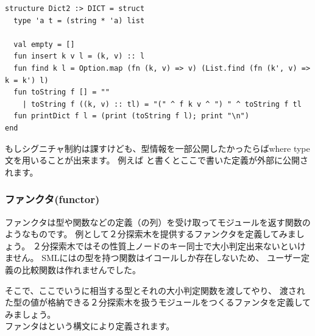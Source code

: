 \documentclass[11pt,a4paper]{jarticle}
\begin{document}
\begin{lstlisting}[caption=リストによる辞書の実装,label=code:list-dict]
structure Dict2 :> DICT = struct
  type 'a t = (string * 'a) list

  val empty = []
  fun insert k v l = (k, v) :: l
  fun find k l = Option.map (fn (k, v) => v) (List.find (fn (k', v) => k = k') l)
  fun toString f [] = ""
    | toString f ((k, v) :: tl) = "(" ^ f k v ^ ") " ^ toString f tl
  fun printDict f l = (print (toString f l); print "\n")
end
\end{lstlisting}

もしシグニチャ制約は課すけども、型情報を一部公開したかったらばwhere type文を用いることが出来ます。
例えば
と書くとここで書いた定義が外部に公開されます。

\subsubsection{ファンクタ(functor)}

ファンクタは型や関数などの定義（の列）を受け取ってモジュールを返す関数のようなものです。
例として２分探索木を提供するファンクタを定義してみましょう。
２分探索木ではその性質上ノードのキー同士で大小判定出来ないといけません。
SMLにはの型を持つ関数はイコールしか存在しないため、
ユーザー定義の比較関数は作れませんでした。

そこで、ここでいうに相当する型とそれの大小判定関数を渡してやり、
渡された型の値が格納できる２分探索木を扱うモジュールをつくるファンタを定義してみましょう。\\
ファンタはという構文により定義されます。
\end{document}
